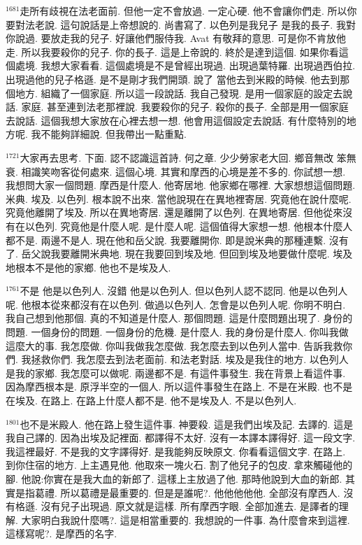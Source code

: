 \documentclass{book}
\begin{document}
$^{1681}$走所有歧視在法老面前.
但他一定不會放過.
一定心硬.
他不會讓你們走.
所以你要對法老說.
這句說話是上帝想說的.
尚書寫了.
以色列是我兒子 是我的長子.
我對你說過.
要放走我的兒子.
好讓他們服侍我.
Avat 有敬拜的意思.
可是你不肯放他走.
所以我要殺你的兒子.
你的長子.
這是上帝說的.
終於是達到這個.
如果你看這個處境.
我想大家看看.
這個處境是不是曾經出現過.
出現過葉特羅.
出現過西伯拉.
出現過他的兒子格遜.
是不是剛才我們開頭.
說了 當他去到米殿的時候.
他去到那個地方.
組織了一個家庭.
所以這一段說話.
我自己發現.
是用一個家庭的設定去說話.
家庭.
甚至連到法老那裡說.
我要殺你的兒子.
殺你的長子.
全部是用一個家庭去說話.
這個我想大家放在心裡去想一想.
他會用這個設定去說話.
有什麼特別的地方呢.
我不能夠詳細說.
但我帶出一點重點.

$^{1721}$大家再去思考.
下面.
認不認識這首詩.
何之章.
少少勞家老大回.
鄉音無改 笨無衰.
相識笑吻客從何處來.
這個心境.
其實和摩西的心境是差不多的.
你試想一想.
我想問大家一個問題.
摩西是什麼人.
他寄居地.
他家鄉在哪裡.
大家想想這個問題.
米典.
埃及.
以色列.
根本說不出來.
當他說現在在異地裡寄居.
究竟他在說什麼呢.
究竟他離開了埃及.
所以在異地寄居.
還是離開了以色列.
在異地寄居.
但他從來沒有在以色列.
究竟他是什麼人呢.
是什麼人呢.
這個值得大家想一想.
他根本什麼人都不是.
兩邊不是人.
現在他和岳父說.
我要離開你.
即是說米典的那種連繫.
沒有了.
岳父說我要離開米典地.
現在我要回到埃及地.
但回到埃及地要做什麼呢.
埃及地根本不是他的家鄉.
他也不是埃及人.

$^{1761}$不是 他是以色列人.
沒錯 他是以色列人.
但以色列人認不認同.
他是以色列人呢.
他根本從來都沒有在以色列.
做過以色列人.
怎會是以色列人呢.
你明不明白.
我自己想到他那個.
真的不知道是什麼人.
那個問題.
這是什麼問題出現了.
身份的問題.
一個身份的問題.
一個身份的危機.
是什麼人.
我的身份是什麼人.
你叫我做這麼大的事.
我怎麼做.
你叫我做我怎麼做.
我怎麼去到以色列人當中.
告訴我救你們.
我拯救你們.
我怎麼去到法老面前.
和法老對話.
埃及是我住的地方.
以色列人是我的家鄉.
我怎麼可以做呢.
兩邊都不是.
有這件事發生.
我在背景上看這件事.
因為摩西根本是.
原浮半空的一個人.
所以這件事發生在路上.
不是在米殿.
也不是在埃及.
在路上.
在路上什麼人都不是.
他不是埃及人.
不是以色列人.

$^{1801}$也不是米殿人.
他在路上發生這件事.
神要殺.
這是我們出埃及記.
去譯的.
這是我自己譯的.
因為出埃及記裡面.
都譯得不太好.
沒有一本譯本譯得好.
這一段文字.
我這裡最好.
不是我的文字譯得好.
是我能夠反映原文.
你看看這個文字.
在路上.
到你住宿的地方.
上主遇見他.
他取來一塊火石.
割了他兒子的包皮.
拿來觸碰他的腳.
他說:你實在是我大血的新郎了.
這樣上主放過了他.
那時他說到大血的新郎.
其實是指葛禮.
所以葛禮是最重要的.
但是是誰呢?.
他他他他他.
全部沒有摩西人.
沒有格遜.
沒有兒子出現過.
原文就是這樣.
所有摩西字眼.
全部加進去.
是譯者的理解.
大家明白我說什麼嗎?.
這是相當重要的.
我想說的一件事.
為什麼會來到這裡.
這樣寫呢?.
是摩西的名字.
\end{document}
